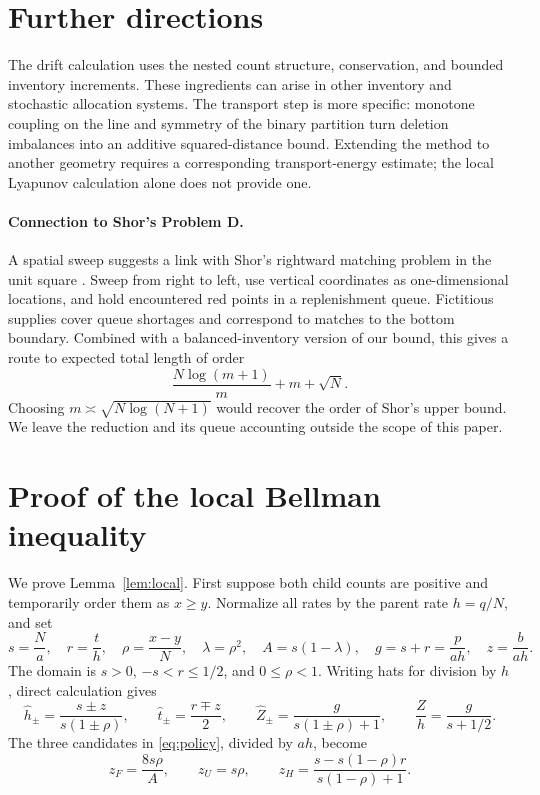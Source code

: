 \documentclass[11pt]{article}
\numberwithin{equation}{section}
\theoremstyle{remark}
\begin{document}
\section{Further directions}\label{sec:extensions}

The drift calculation uses the nested count structure, conservation, and
bounded inventory increments. These ingredients can arise in other
inventory and stochastic allocation systems. The transport step is more
specific: monotone coupling on the line and symmetry of the binary
partition turn deletion imbalances into an additive squared-distance
bound. Extending the method to another geometry requires a corresponding
transport-energy estimate; the local Lyapunov calculation alone does not
provide one.

\paragraph{Connection to Shor's Problem D.}
A spatial sweep suggests a link with Shor's rightward matching problem
in the unit square \cite{Shor}. Sweep from right to left, use vertical
coordinates as one-dimensional locations, and hold encountered red
points in a replenishment queue. Fictitious supplies cover queue
shortages and correspond to matches to the bottom boundary.
Combined with a balanced-inventory version of our bound, this gives a
route to expected total length of order
\[
\frac{N\log(m+1)}m+m+\sqrt N.
\]
Choosing \(m\asymp\sqrt{N\log(N+1)}\) would recover the order of Shor's
upper bound. We leave the reduction and its queue accounting outside the
scope of this paper.

\appendix
\section{Proof of the local Bellman inequality}\label{app:local-proof}

We prove Lemma~\ref{lem:local}. First suppose both child counts are
positive and temporarily order them as \(x\ge y\). Normalize all rates by
the parent rate \(h=q/N\), and set
\begin{equation}\label{eq:normalized}
s=\frac Na,\quad r=\frac th,\quad \rho=\frac{x-y}{N},\quad
\lambda=\rho^2,\quad A=s(1-\lambda),\quad
g=s+r=\frac p{ah},\quad z=\frac b{ah}.
\end{equation}
The domain is \(s>0\), \(-s<r\le1/2\), and \(0\le\rho<1\).
Writing hats for division by \(h\), direct calculation gives
\begin{equation}\label{eq:child-normalized}
\widehat h_\pm=\frac{s\pm z}{s(1\pm\rho)},\qquad
\widehat t_\pm=\frac{r\mp z}{2},\qquad
\widehat Z_\pm=\frac{g}{s(1\pm\rho)+1},\qquad
\frac Zh=\frac{g}{s+1/2}.
\end{equation}
The three candidates in \eqref{eq:policy}, divided by \(ah\), become
\begin{equation}\label{eq:normalized-policy}
z_F=\frac{8s\rho}{A},\qquad
z_U=s\rho,\qquad
z_H=\frac{s-s(1-\rho)r}{s(1-\rho)+1}.
\end{equation}
\end{document}
